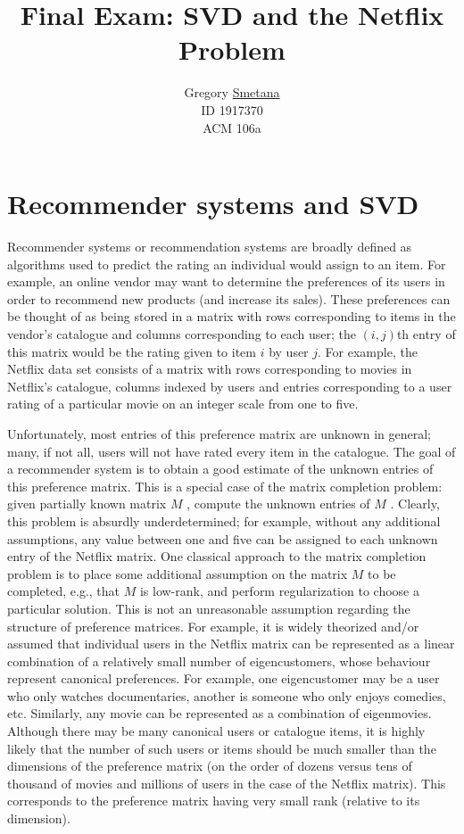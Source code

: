 \documentclass[11pt]{article} %
\title{Final Exam: SVD and the Netflix Problem}
\author{ Gregory \uline{Smetana} \\ID 1917370 \\ ACM 106a }
\begin{document}
\maketitle

\section{Recommender systems and SVD}
Recommender systems or recommendation systems are broadly defined as algorithms used to predict the
rating an individual would assign to an item. For example, an online vendor may want to determine the
preferences of its users in order to recommend new products (and increase its sales). These preferences can
be thought of as being stored in a matrix with rows corresponding to items in the vendor’s catalogue and
columns corresponding to each user; the $(i, j)$th entry of this matrix would be the rating given to item $i$ by
user $j$. For example, the Netflix data set consists of a matrix with rows corresponding to movies in Netflix’s
catalogue, columns indexed by users and entries corresponding to a user rating of a particular movie on an
integer scale from one to five.

Unfortunately, most entries of this preference matrix are unknown in general; many, if not all, users will
not have rated every item in the catalogue. The goal of a recommender system is to obtain a good estimate
of the unknown entries of this preference matrix. This is a special case of the matrix completion problem:
given partially known matrix $M$ , compute the unknown entries of $M$ . Clearly, this problem is absurdly
underdetermined; for example, without any additional assumptions, any value between one and five can be
assigned to each unknown entry of the Netflix matrix. One classical approach to the matrix completion
problem is to place some additional assumption on the matrix $M$ to be completed, e.g., that $M$ is low-rank,
and perform regularization to choose a particular solution. This is not an unreasonable assumption regarding
the structure of preference matrices. For example, it is widely theorized and/or assumed that individual
users in the Netflix matrix can be represented as a linear combination of a relatively small number of
eigencustomers, whose behaviour represent canonical preferences. For example, one eigencustomer may be
a user who only watches documentaries, another is someone who only enjoys comedies, etc. Similarly, any
movie can be represented as a combination of eigenmovies. Although there may be many canonical users or
catalogue items, it is highly likely that the number of such users or items should be much smaller than the
dimensions of the preference matrix (on the order of dozens versus tens of thousand of movies and millions
of users in the case of the Netflix matrix). This corresponds to the preference matrix having very small rank
(relative to its dimension).
\end{document}
